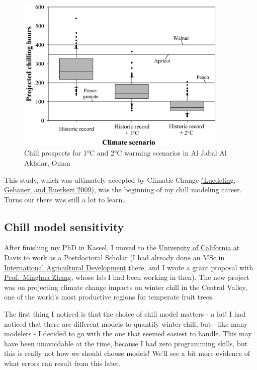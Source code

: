 \documentclass[
]{book}
\begin{document}
\begin{figure}
\centering
\includegraphics[width=0.9\textwidth,height=\textheight]{pictures/Luedeling_JPG_Figure_10_Future_chilling.JPG}
\caption{Chill prospects for 1°C and 2°C warming scenarios in Al Jabal Al Akhdar, Oman}
\end{figure}

This study, which was ultimately accepted by Climatic Change \href{https://link.springer.com/article/10.1007/s10584-009-9581-7}{(Luedeling, Gebauer, and Buerkert \protect\hyperlink{ref-luedeling_climate_2009}{2009})}, was the beginning of my chill modeling career. Turns our there was still a lot to learn\ldots{}

\hypertarget{chill-model-sensitivity}{%
\subsection{Chill model sensitivity}\label{chill-model-sensitivity}}

After finishing my PhD in Kassel, I moved to the \href{https://www.ucdavis.edu/}{University of California at Davis} to work as a Postdoctoral Scholar (I had already done an \href{https://iad.ucdavis.edu/}{MSc in International Agricultural Development} there, and I wrote a grant proposal with \href{http://agis.ucdavis.edu/people/minghua_zhang/index.html}{Prof.~Minghua Zhang}, whose lab I had been working in then). The new project was on projecting climate change impacts on winter chill in the Central Valley, one of the world's most productive regions for temperate fruit trees.

The first thing I noticed is that the choice of chill model matters - a lot! I had noticed that there are different models to quantify winter chill, but - like many modelers - I decided to go with the one that seemed easiest to handle. This may have been unavoidable at the time, because I had zero programming skills, but this is really not how we should choose models! We'll see a bit more evidence of what errors can result from this later.
\end{document}
